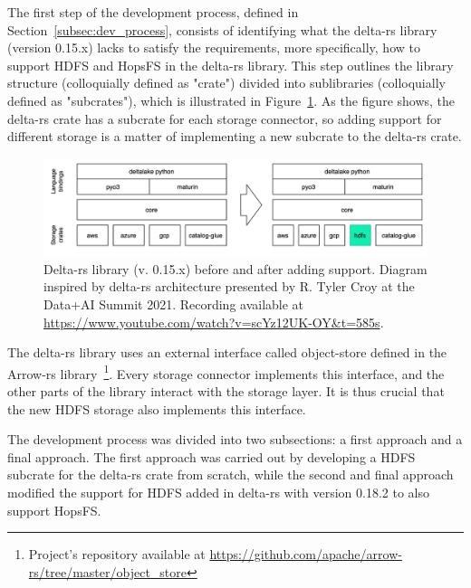 
The first step of the development process, defined in Section~\ref{subsec:dev_process}, consists of identifying what the delta-rs library (version 0.15.x) lacks to satisfy the requirements, more specifically, how to support \gls{HDFS} and \gls{HopsFS} in the delta-rs library. This step outlines the library structure (colloquially defined as "crate") divided into sublibraries (colloquially defined as "subcrates"), which is illustrated in Figure~\ref{fig:delta-rs_schema}. As the figure shows, the delta-rs crate has a subcrate for each storage connector, so adding support for different storage is a matter of implementing a new subcrate to the delta-rs crate.

\begin{figure}[!ht]
    \begin{center}
      \includegraphics[width=\textwidth]{figures/4-implementation/delta-rs_schema.png}
    \caption[Delta-rs architecture before and after implementation]{Delta-rs library (v. 0.15.x) before and after adding  support. Diagram inspired by delta-rs architecture presented by R. Tyler Croy at the Data+AI Summit 2021. Recording available at \url{https://www.youtube.com/watch?v=scYz12UK-OY&t=585s}.}
    \label{fig:delta-rs_schema}
    \end{center}
\end{figure}

The delta-rs library uses an external interface called object-store defined in the Arrow-rs library~\footnote{Project's repository available at \url{https://github.com/apache/arrow-rs/tree/master/object_store}}. Every storage connector implements this interface, and the other parts of the library interact with the storage layer. It is thus crucial that the new \gls{HDFS} storage also implements this interface.

The development process was divided into two subsections: a first approach and a final approach. The first approach was carried out by developing a \gls{HDFS} subcrate for the delta-rs crate from scratch, while the second and final approach modified the support for \gls{HDFS} added in delta-rs with version 0.18.2 to also support \gls{HopsFS}.

